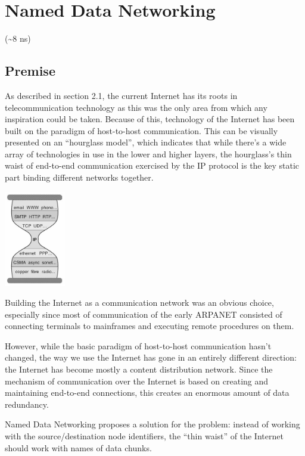     \section{Named Data Networking}
        (\textasciitilde8 ns)
        \subsection{Premise}
            As described in section 2.1, the current Internet has its roots in telecommunication technology as this was the only area from which any inspiration could be taken. Because of this, technology of the Internet has been built on the paradigm of host-to-host communication. This can be visually presented on an ``hourglass model'', which indicates that while there's a wide array of technologies in use in the lower and higher layers, the hourglass's thin waist of end-to-end communication exercised by the IP protocol is the key static part binding different networks together.

            \begin{center}\includegraphics[width=0.2\textwidth]{media/ndn_hourglass1.jpg}\end{center}

            Building the Internet as a communication network was an obvious choice, especially since most of communication of the early ARPANET consisted of connecting terminals to mainframes and executing remote procedures on them.

            However, while the basic paradigm of host-to-host communication hasn't changed, the way we use the Internet has gone in an entirely different direction: the Internet has become mostly a content distribution network. Since the mechanism of communication over the Internet is based on creating and maintaining end-to-end connections, this creates an enormous amount of data redundancy.

            Named Data Networking proposes a solution for the problem: instead of working with the source/destination node identifiers, the ``thin waist'' of the Internet should work with names of data chunks.


